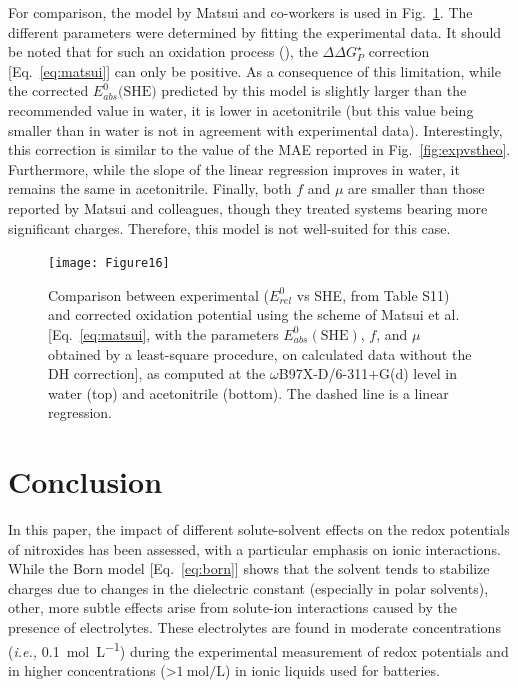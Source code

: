 \documentclass[review,preprint]{elsarticle}
\begin{document}
For comparison, the model by Matsui and co-workers \cite{matsuiDensityFunctionalTheory2013} is used in Fig.~\ref{fig:matsui}. The different parameters were determined by fitting the experimental data. It should be noted that for such an oxidation process (), the $\Delta\Delta G^\star_P$ correction [Eq.~\eqref{eq:matsui}] can only be positive. As a consequence of this limitation, while the corrected $E^0_{abs}(\text{SHE)}$  predicted by this model is slightly larger than the recommended value in water, it is lower in acetonitrile (but this value being smaller than in water is not in agreement with experimental data). Interestingly, this correction is similar to the value of the MAE reported in Fig.~\ref{fig:expvstheo}. Furthermore, while the slope of the linear regression improves in water, it remains the same in acetonitrile. Finally, both $f$ and $\mu$ are smaller than those reported by Matsui and colleagues, though they treated systems bearing more significant charges. Therefore, this model is not well-suited for this case.


\begin{figure}[!h]
	\centering
	\texttt{[image: Figure16]}
	\caption{Comparison between experimental ($E^0_{rel} $ vs SHE, from Table S11) and corrected oxidation potential using the scheme of Matsui et al. \cite{matsuiDensityFunctionalTheory2013} [Eq.~\eqref{eq:matsui}, with the parameters $E_{abs}^0(\text{SHE})$, $f$, and $\mu$ obtained by a least-square procedure, on calculated data without the DH correction], as computed at the $\omega$B97X-D/6-311+G(d) level in water (top) and acetonitrile (bottom). The dashed line is a linear regression. }
	\label{fig:matsui}
\end{figure}

\clearpage
\section{Conclusion} \label{sec:conclusion}

In this paper, the impact of different solute-solvent effects on the redox potentials of nitroxides has been assessed, with a particular emphasis on ionic interactions. While the Born model [Eq.~\eqref{eq:born}] shows that the solvent tends to stabilize charges due to changes in the dielectric constant (especially in polar solvents), other, more subtle effects arise from solute-ion interactions caused by the presence of electrolytes. These electrolytes are found in moderate concentrations (\textit{i.e.,} \SI{0.1}{\mole\per\liter}) during the experimental measurement of redox potentials and in higher concentrations (>$\SI{1}{\mole\per\liter}$) in ionic liquids used for batteries.
\end{document}
